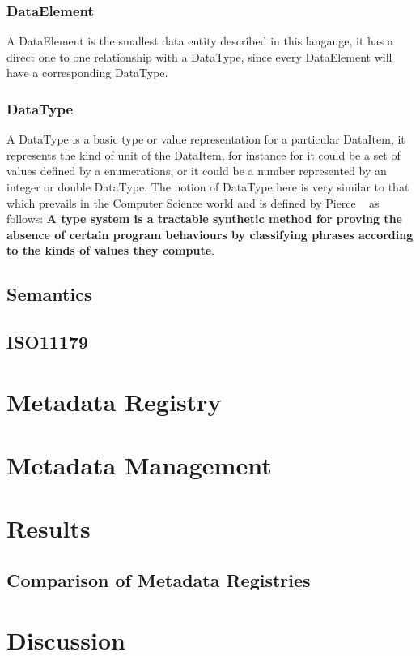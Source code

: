 \documentclass{llncs}
\begin{document}
 \subsubsection{DataElement}
 A DataElement is the smallest data entity described in this langauge, it has a direct one to one relationship with a DataType, since every DataElement will have a corresponding DataType. 
 
 \subsubsection{DataType}
 A DataType is a basic type or value representation for a particular DataItem, it represents the kind of unit of the DataItem, for instance for it could be a set of values defined by a enumerations, or it could be a number represented by an integer or double DataType. The notion of DataType here is very similar to that which prevails in the Computer Science world and is defined by Pierce  ~\cite{Pierce} as follows:
\textbf{A type system is a tractable synthetic method for proving the absence of certain program behaviours by classifying phrases according to the kinds of values they compute}. 






\subsection{Semantics}


\subsection{ISO11179}



\section{Metadata Registry}

\subsection{}


\section{Metadata Management}



\section{Results}

\subsection{Comparison of Metadata Registries}


\section{Discussion}

 


\newpage




\end{document}
